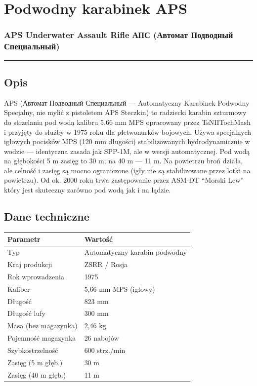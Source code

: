\documentclass[12pt,openany,oneside]{book}
\begin{document}
\chapter{Podwodny karabinek APS}\label{podwodny-karabinek-aps}

\subsection{APS Underwater Assault Rifle \textbar{} АПС (Автомат
Подводный
Специальный)}\label{aps-underwater-assault-rifle-ux430ux43fux441-ux430ux432ux442ux43eux43cux430ux442-ux43fux43eux434ux432ux43eux434ux43dux44bux439-ux441ux43fux435ux446ux438ux430ux43bux44cux43dux44bux439}

\begin{center}\rule{0.5\linewidth}{0.5pt}\end{center}

\section{Opis}\label{opis-100}

APS (Автомат Подводный Специальный --- Automatyczny Karabinek Podwodny
Specjalny, nie mylić z pistoletem APS Steczkin) to radziecki karabin
szturmowy do strzelania pod wodą kalibru 5,66 mm MPS opracowany przez
TsNIITochMash i przyjęty do służby w 1975 roku dla płetwonurków
bojowych. Używa specjalnych igłowych pocisków MPS (120 mm długości)
stabilizowanych hydrodynamicznie w wodzie --- identyczna zasada jak
SPP-1M, ale w wersji automatycznej. Pod wodą na głębokości 5 m zasięg to
30 m; na 40 m --- 11 m. Na powietrzu broń działa, ale celność i zasięg
są mocno ograniczone (igły nie są stabilizowane przez lotki na
powietrzu). Od ok. 2000 roku trwa zastępowanie przez ASM-DT ``Morski
Lew'' który jest skuteczny zarówno pod wodą jak i na lądzie.

\section{Dane techniczne}\label{dane-techniczne-100}

\begin{longtable}[]{@{}ll@{}}
\toprule\noalign{}
Parametr & Wartość \\
\midrule\noalign{}
\endhead
\bottomrule\noalign{}
\endlastfoot
Typ & Automatyczny karabin podwodny \\
Kraj produkcji & ZSRR / Rosja \\
Rok wprowadzenia & 1975 \\
Kaliber & 5,66 mm MPS (igłowy) \\
Długość & 823 mm \\
Długość lufy & 300 mm \\
Masa (bez magazynka) & 2,46 kg \\
Pojemność magazynka & 26 nabojów \\
Szybkostrzelność & 600 strz./min \\
Zasięg (5 m głęb.) & 30 m \\
Zasięg (40 m głęb.) & 11 m \\
\end{longtable}
\end{document}
